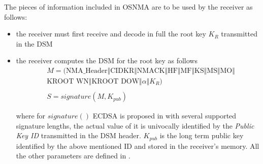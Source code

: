 The pieces of information included in OSNMA are to be used by the receiver as
follows:
\begin{itemize}
\item the receiver must first receive and decode in full the root key $K_R$
transmitted in the DSM
\item the receiver computes the DSM for the root key as follows
\begin{align*}
& M = (\text{NMA\_Header} \Vert \text{CIDKR} \Vert \text{NMACK} \Vert \text{HF}
\Vert \text{MF} \Vert \text{KS} \Vert \text{MS} \Vert \text{MO} \Vert \\
& \text{KROOT WN} \Vert \text{KROOT DOW} \Vert \alpha \Vert K_R) \\
\\
& S = signature(M, K_{pub})
\end{align*}

where for $signature()$ ECDSA is proposed in \cite{osnma} with several supported
signature lengths, the actual value of it is univocally identified by the
\textit{Public Key ID} transmitted in the DSM header. $K_{pub}$ is the long term
public key identified by the above mentioned ID and stored in the receiver's
memory. All the other parameters are defined in \cite{osnma}.


\end{itemize}
